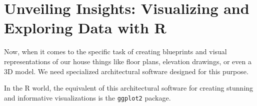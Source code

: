 \chapter{Unveiling Insights: Visualizing and Exploring Data with R}

Now, when it comes to the specific task of creating blueprints and visual representations of our house things like floor plans, elevation drawings, or even a 3D model. We need specialized architectural software designed for this purpose.

In the R world, the equivalent of this architectural software for creating stunning and informative visualizations is the \texttt{ggplot2} package.
 
 
 
 
 
 